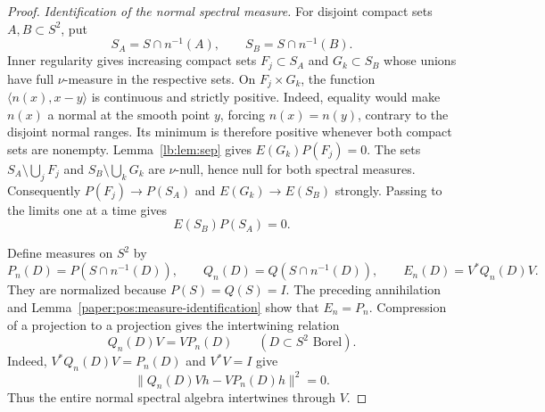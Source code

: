 \documentclass[11pt,letterpaper]{amsart}
\theoremstyle{definition}
\theoremstyle{remark}
\numberwithin{equation}{section}
\begin{document}
\begin{proof}
\emph{Identification of the normal spectral measure.}
For disjoint compact sets $A,B\subset S^2$, put
\[
             S_A=S\cap n^{-1}(A),\qquad
             S_B=S\cap n^{-1}(B).
\]
Inner regularity gives increasing compact sets
$F_j\subset S_A$ and $G_k\subset S_B$ whose unions have
full $\nu$-measure in the respective sets. On
$F_j\times G_k$, the function
$\langle n(x),x-y\rangle$ is continuous and strictly
positive. Indeed, equality would make $n(x)$ a normal at
the smooth point $y$, forcing $n(x)=n(y)$, contrary to the
disjoint normal ranges. Its minimum is therefore positive
whenever both compact sets are nonempty.
Lemma~\ref{lb:lem:sep} gives $E(G_k)P(F_j)=0$.
The sets $S_A\setminus\bigcup_jF_j$ and
$S_B\setminus\bigcup_kG_k$ are $\nu$-null, hence null for both
spectral measures. Consequently
$P(F_j)\to P(S_A)$ and $E(G_k)\to E(S_B)$ strongly. Passing to the
limits one at a time gives
\[
                         E(S_B)P(S_A)=0.
\]

Define measures on $S^2$ by
\[
 P_n(D)=P(S\cap n^{-1}(D)),\qquad
 Q_n(D)=Q(S\cap n^{-1}(D)),\qquad
 E_n(D)=V^*Q_n(D)V.
\]
They are normalized because $P(S)=Q(S)=I$.
The preceding annihilation and
Lemma~\ref{paper:pos:measure-identification} show that
$E_n=P_n$. Compression of a projection to a projection
gives the intertwining relation
\begin{equation}\label{paper:pos:normal-intertwining}
                       Q_n(D)V=VP_n(D)
                       \qquad(D\subset S^2\text{ Borel}).
\end{equation}
Indeed, $V^*Q_n(D)V=P_n(D)$ and $V^*V=I$ give
\[
                    \|Q_n(D)Vh-VP_n(D)h\|^2=0.
\]
Thus the entire normal spectral algebra intertwines through $V$.


\end{proof}
\end{document}
